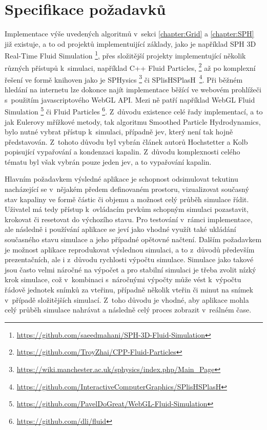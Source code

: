 \section{Specifikace požadavků}
\label{chapter:spec}
Implementace výše uvedených algoritmů v~sekci \ref{chapter:Grid} a \ref{chapter:SPH} již existuje, a to od projektů implementuijící základy, jako je například SPH 3D Real-Time Fluid Simulation \footnote{\url{https://github.com/saeedmahani/SPH-3D-Fluid-Simulation}}, přes složitější projekty implementující několik různých přístupů k~simulaci, například C++ Fluid Particles, \footnote{\url{https://github.com/TroyZhai/CPP-Fluid-Particles}} až po komplexní řešení ve formě knihoven jako je SPHysics \footnote{\url{https://wiki.manchester.ac.uk/sphysics/index.php/Main_Page}} či SPlisHSPlasH~\footnote{\url{https://github.com/InteractiveComputerGraphics/SPlisHSPlasH}}. Při běžném hledání na internetu lze dokonce najít implementace běžící ve webovém prohlížeči s~použitím javascriptového WebGL API. Mezi ně patří například WebGL Fluid Simulation \footnote{\url{https://github.com/PavelDoGreat/WebGL-Fluid-Simulation}} či Fluid Particles \footnote{\url{https://github.com/dli/fluid}}. Z~důvodu existence celé řady implementací, a to jak Eulerovy mřížkové metody, tak algoritmu Smoothed Particle Hydrodynamics, bylo nutné vybrat přístup k~simulaci, případně jev, který není tak hojně představován. Z~tohoto důvodu byl vybrán článek autorů Hochstetter a Kolb popisující vypařování a kondenzaci kapalin. Z~důvodu komplexnosti celého tématu byl však vybrán pouze jeden jev, a to vypařování kapalin.

Hlavním požadavkem výsledné aplikace je schopnost odsimulovat tekutinu nacházející se v~nějakém předem definovaném prostoru, vizualizovat současný stav kapaliny ve formě částic či objemu a možnost celý průběh simulace řídit. Uživatel má tedy přístup k~ovládacím prvkům schopným simulaci pozastavit, krokovat či resetovat do výchozího stavu. Pro testování v~rámci implementace, ale následně i používání aplikace se jeví jako vhodné využít také ukládání současného stavu simulace a jeho případné opětovné načtení. Dalším požadavkem je možnost aplikace reprodukovat výslednou simulaci, a to z~důvodů především prezentačních, ale i z~důvodu rychlosti výpočtu simulace. Simulace jako takové jsou často velmi náročné na výpočet a pro stabilní simulaci je třeba zvolit nízký krok simulace, což v~kombinaci s~náročnými výpočty může vést k~výpočtu řádově jednotek snímků za vteřinu, případně několik vteřin či minut na snímek v~případě složitějších simulací. Z~toho důvodu je vhodné, aby aplikace mohla celý průběh simulace nahrávat a následně celý proces zobrazit v~reálném čase. 

